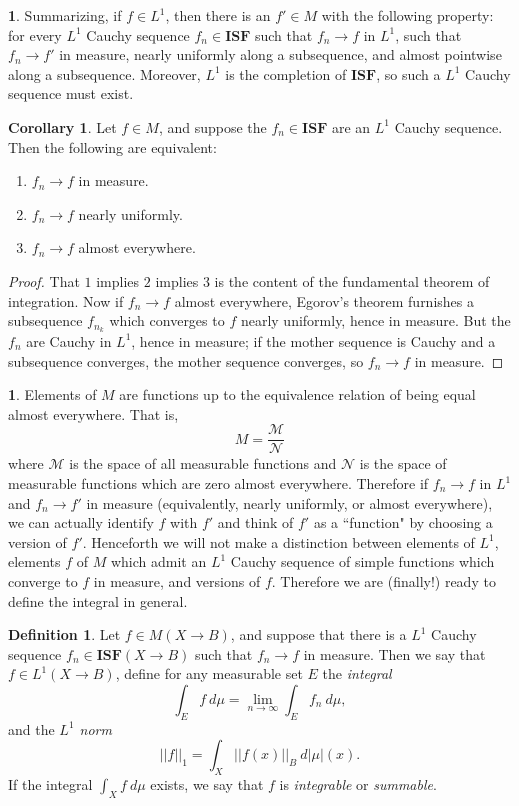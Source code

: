 \documentclass[12pt]{book}
\newcommand{\ISF}{\mathbf{ISF}}
\newcommand{\dfn}[1]{\emph{#1}\index{#1}}
\theoremstyle{definition}
\newtheorem{corollary}[theorem]{Corollary}
\newtheorem{subsec}[theorem]{}
\newtheorem{definition}[theorem]{Definition}
\begin{document}
\begin{subsec}
Summarizing, if $f \in L^1$, then there is an $f' \in M$ with the following property: for every $L^1$ Cauchy sequence $f_n \in \ISF$ such that $f_n \to f$ in $L^1$, such that $f_n \to f'$ in measure, nearly uniformly along a subsequence, and almost pointwise along a subsequence.
Moreover, $L^1$ is the completion of $\ISF$, so such a $L^1$ Cauchy sequence must exist.
\end{subsec}

\begin{corollary}
Let $f \in M$, and suppose the $f_n \in \ISF$ are an $L^1$ Cauchy sequence. Then the following are equivalent:
\begin{enumerate}
\item $f_n \to f$ in measure.
\item $f_n \to f$ nearly uniformly.
\item $f_n \to f$ almost everywhere.
\end{enumerate}
\end{corollary}
\begin{proof}
That $1$ implies $2$ implies $3$ is the content of the fundamental theorem of integration.
Now if $f_n \to f$ almost everywhere, Egorov's theorem furnishes a subsequence $f_{n_k}$ which converges to $f$ nearly uniformly, hence in measure.
But the $f_n$ are Cauchy in $L^1$, hence in measure; if the mother sequence is Cauchy and a subsequence converges, the mother sequence converges, so $f_n \to f$ in measure.
\end{proof}

\begin{subsec}
Elements of $M$ are functions up to the equivalence relation of being equal almost everywhere.
That is,
$$M = \frac{\mathcal M}{\mathcal N}$$
where $\mathcal M$ is the space of all measurable functions and $\mathcal N$ is the space of measurable functions which are zero almost everywhere.
Therefore if $f_n \to f$ in $L^1$ and $f_n \to f'$ in measure (equivalently, nearly uniformly, or almost everywhere), we can actually identify $f$ with $f'$ and think of $f'$ as a ``function" by choosing a version of $f'$.
Henceforth we will not make a distinction between elements of $L^1$, elements $f$ of $M$ which admit an $L^1$ Cauchy sequence of simple functions which converge to $f$ in measure, and versions of $f$.
Therefore we are (finally!) ready to define the integral in general.
\end{subsec}

\begin{definition}
Let $f \in M(X \to B)$, and suppose that there is a $L^1$ Cauchy sequence $f_n \in \ISF(X \to B)$ such that $f_n \to f$ in measure. Then we say that $f \in L^1(X \to B)$, define for any measurable set $E$ the \dfn{integral}
$$\int_E f ~d\mu = \lim_{n \to \infty} \int_E f_n~d\mu,$$
and the \dfn{$L^1$ norm}
$$||f||_1 = \int_X ||f(x)||_B ~d|\mu|(x).$$
If the integral $\int_X f~d\mu$ exists, we say that $f$ is \dfn{integrable} or \dfn{summable}.
\end{definition}
\end{document}
